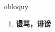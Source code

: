 
\begin{frame}
{\huge obloquy}
\begin{center}
\begin{enumerate}\Large
  \item \textbf{谩骂，诽谤}
\end{enumerate}
\end{center}
\end{frame}
